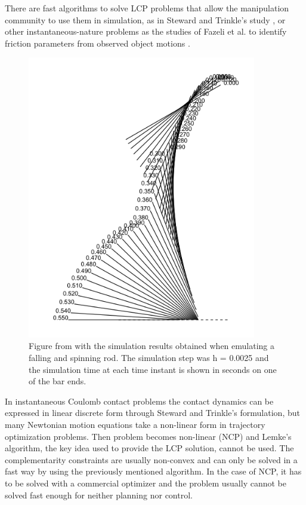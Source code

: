\documentclass[12,twoside]{TFG-GM}
\theoremstyle{definition}
\theoremstyle{remark}
\begin{document}
There are fast algorithms to solve LCP problems that allow the manipulation community to use them in simulation, as in Steward and Trinkle's study \cite{lcpd}, or other instantaneous-nature problems as the studies of Fazeli et al. to identify friction parameters from observed object motions \cite{fazeli2015identifiability} \cite{fazeli2016parameter}.
\begin{figure}[htb!]
\begin{center}
\includegraphics[width=10cm]{lcp.png}
\end{center}
\caption[test caption]{\label{fig:lcp} \small{Figure from \protect\cite{lcpd} with the simulation results obtained when emulating a falling and spinning rod. The simulation step was h = 0.0025 and the simulation time at each time instant is shown in seconds on one of the bar ends.}}
\end{figure}

In instantaneous Coulomb contact problems the contact dynamics can be expressed in linear discrete form through Steward and Trinkle's formulation, but many Newtonian motion equations take a non-linear form in trajectory optimization problems. Then problem becomes non-linear (NCP) and Lemke's algorithm, the key idea used to provide the LCP solution, cannot be used. The complementarity constraints are usually non-convex and can only be solved in a fast way by using the previously mentioned algorithm. In the case of NCP, it has to be solved with a commercial optimizer and the problem usually cannot be solved fast enough for neither planning nor control.
\end{document}
